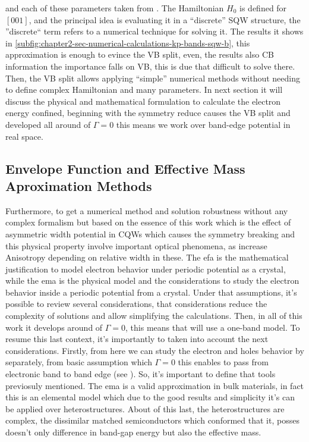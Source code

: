 and each of these parameters taken from \cite{vurgaftman2020bands}. The Hamiltonian $H_{0}$ is defined for $\left[001\right]$, and the principal idea is evaluating it in a ``discrete'' SQW structure, the ''discrete`` term refers to a numerical technique for solving it. The results it shows in \cref{subfig:chapter2-sec-numerical-calculations-kp-bands-sqw-b}, this approximation is enough to evince the \gls{VB} split, even, the results also \gls{CB} information the importance falls on  \gls{VB}, this is due that difficult to solve there.  Then, the VB split allows applying ``simple'' numerical methods without needing to define complex Hamiltonian and many parameters. In next section it will discuss the physical and mathematical formulation to calculate the electron energy confined, beginning with the symmetry reduce causes the \gls{VB} split and developed all around of $\Gamma =0$ this means we work over band-edge potential in real space. 


\subsection{Envelope Function and Effective Mass Aproximation Methods}
\label{subsec:chapter-2-efa-and-ema}
\vspace{-10mm} 
Furthermore, to get a numerical method and solution robustness without any complex formalism but based on the essence of this work which is the effect of asymmetric width potential in CQWs which causes the symmetry breaking and this physical property involve important optical phenomena, as increase Anisotropy depending on relative width in these.
The \gls{efa} is the mathematical justification to model electron behavior under periodic potential as a crystal, while the \gls{ema} is the physical model and the considerations to study the electron behavior inside a periodic potential from a crystal\cite{harrison2016quantum}.
Under that assumptions, it's possible to review several considerations, that considerations reduce the complexity of solutions and allow simplifying the calculations. Then, in all of this work  it develops around of  $\Gamma=0$, this means that will use a one-band model. To resume this last context, it's importantly to taken into account the next considerations. Firstly, from here we can study the electron and holes behavior by separately, from basic assumption which $\Gamma=0$ this enables to pass from electronic band to band edge (see ). So, it's important to define that tools previosuly mentioned. The \gls{ema} is a valid approximation in bulk materials, in fact this is an elemental model which  due to the good results and simplicity it's can be applied over heterostructures.  About of this last, the heterostructures are complex, the dissimilar matched semiconductors which conformed that it, posses doesn't only difference in band-gap energy but also the effective mass.  

